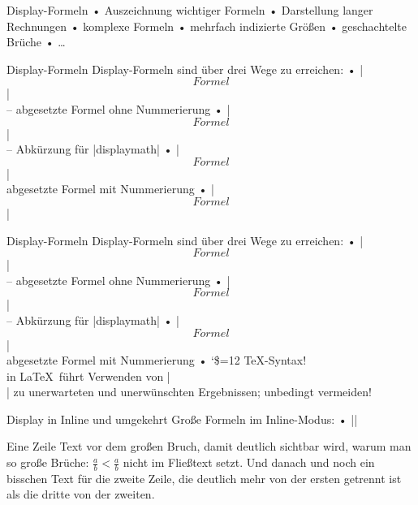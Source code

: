\begin{frame}{Display-Formeln}
• Auszeichnung wichtiger Formeln
• Darstellung langer Rechnungen
• komplexe Formeln
• mehrfach indizierte Größen
• geschachtelte Brüche
• …
\•
\end{frame}

\begin{frame}[fragile]{ Display-Formeln}
Display-Formeln sind über drei Wege zu erreichen:
• |\begin{displaymath} Formel \end{displaymath}|\\%
– abgesetzte Formel ohne Nummerierung
• |\[ Formel \]|\\%
– Abkürzung für |displaymath|
• |\begin{equation} Formel \end{equation}|%
\\ abgesetzte Formel mit Nummerierung
• |$$ Formel $$|
\•
\end{frame}

\begin{frame}[fragile]{ Display-Formeln}
Display-Formeln sind über drei Wege zu erreichen:
• |\begin{displaymath} Formel \end{displaymath}|\\%
– abgesetzte Formel ohne Nummerierung
• |\[ Formel \]|\\%
– Abkürzung für |displaymath|
• |\begin{equation} Formel \end{equation}|%
\\ abgesetzte Formel mit Nummerierung
• \catcode`\$=12  \alert{\TeX-Syntax!}%
\\ \alert{in \LaTeX\ führt Verwenden von |$$ $$| zu unerwarteten und unerwünschten Ergebnissen; unbedingt vermeiden!}
\•
\end{frame}


\begin{frame}[fragile]{Display in Inline und umgekehrt}
Große Formeln im Inline-Modus:
• |\displaystyle|
\• 
\begin{LTXexample}[pos=b]
Eine Zeile Text vor dem großen Bruch, damit deutlich sichtbar wird, warum man so große Brüche: $ < $ nicht im Fließtext setzt. Und danach und noch ein bisschen Text für die zweite Zeile, die deutlich mehr von der ersten getrennt ist als die dritte von der zweiten.
\end{LTXexample}
\end{frame}

